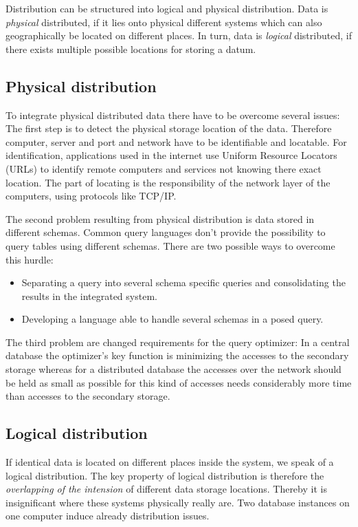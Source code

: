 Distribution can be structured into logical and physical distribution. Data is \textit{physical} distributed, if it lies onto physical different systems which can also geographically be located on different places. In turn, data is \textit{logical} distributed, if there exists multiple possible locations for storing a datum. 

\subsection{Physical distribution}
To integrate physical distributed data there have to be overcome several issues: The first step is to detect the physical storage location of the data. Therefore computer, server and port and network have to be identifiable and locatable. For identification, applications used in the internet use Uniform Resource Locators (URLs) to identify remote computers and services not knowing there exact location. The part of locating is the responsibility of the network layer of the computers, using protocols like TCP/IP.

The second problem resulting from physical distribution is data stored in different schemas. Common query languages don't provide the possibility to query tables using different schemas. There are two possible ways to overcome this hurdle:
\begin{itemize}
\item Separating a query into several schema specific queries and consolidating the results in the integrated system.
\item Developing a language able to handle several schemas in a posed query.
\end{itemize}

The third problem are changed requirements for the query optimizer: In a central database the optimizer's key function is minimizing  the accesses to the secondary storage whereas for a distributed database the accesses over the network should be held as small as possible for this kind of accesses needs considerably more time than accesses to the secondary storage.  

\subsection{Logical distribution}
If identical data is located on different places inside the system, we speak of a logical distribution. The key property of logical distribution is therefore the \textit{overlapping of the intension} of different data storage locations. Thereby it is insignificant where these systems physically really are. Two database instances on one computer induce already distribution issues.


